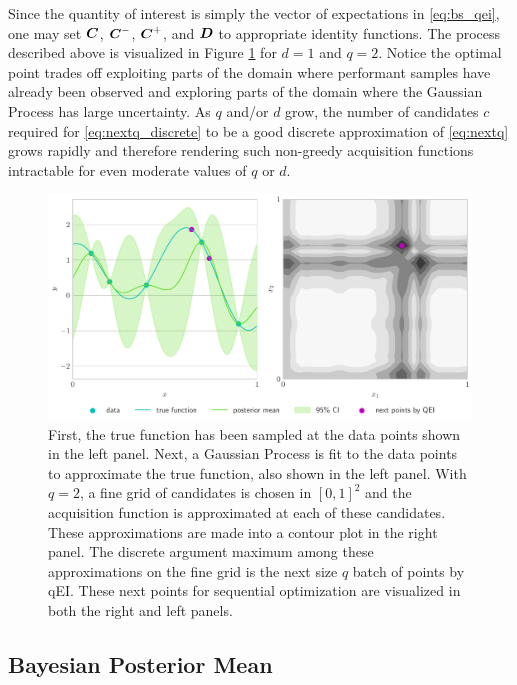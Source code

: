 \documentclass{article}[12pt]
\begin{document}
Since the quantity of interest is simply the vector of expectations in \eqref{eq:bs_qei}, one may set $\boldsymbol{C}$, $\boldsymbol{C}^-$, $\boldsymbol{C}^+$, and $\boldsymbol{D}$ to appropriate identity functions. The process described above is visualized in Figure \ref{fig:bo_qei} for $d=1$ and $q=2$. Notice the optimal point trades off exploiting parts of the domain where performant samples have already been observed and  exploring parts of the domain where the Gaussian Process has large uncertainty.  As $q$ and/or $d$ grow, the number of candidates $c$ required for \eqref{eq:nextq_discrete} to be a good discrete approximation of \eqref{eq:nextq} grows rapidly and therefore rendering such non-greedy acquisition functions intractable for even moderate values of $q$ or $d$.

\begin{figure}[H]
    \centering
    \includegraphics[width=\textwidth]{figs/gp.pdf}
    \caption{First, the true function has been sampled at the data points shown in the left panel. Next, a Gaussian Process is fit to the data points to approximate the true function, also shown in the left panel. With $q=2$, a fine grid of candidates is chosen in $[0,1]^{2}$ and the acquisition function is approximated at each of these candidates. These approximations are made into a contour plot in the right panel. The discrete argument maximum among these approximations on the fine grid is the next size $q$ batch of points by qEI. These next points for sequential optimization are visualized in both the right and left panels. }
    \label{fig:bo_qei}
\end{figure}

\subsection{Bayesian Posterior Mean}
\end{document}
